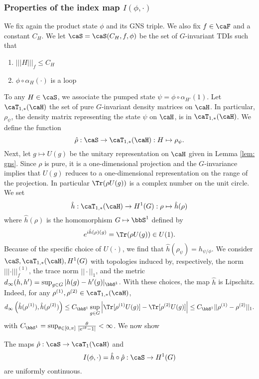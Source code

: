 \subsubsection{Properties of the index map $I(\phi,\cdot)$}

We fix again the product state $\phi$  and its GNS triple. We also fix $f\in\caF$ and a constant $C_H$.  
We let  $\caS=\caS(C_H,f,\phi)$ be the set of $G$-invariant TDIs such that
\begin{enumerate}
	\item $|||H|||_f \leq C_H$
	\item $\phi\circ\alpha_H(\cdot)$ is a loop
\end{enumerate}
To any $H \in \caS$, we associate the pumped state $\psi=\phi\circ\alpha_{H'}(1)$. 
Let  $\caT_{1,*}(\caH)$ the set of pure $G$-invariant density matrices on $\caH$. In particular,  $\rho_\psi$, the density matrix representing the state $\psi$ on $\caH$, is in $\caT_{1,*}(\caH)$.
We define the function
$$
\hat\rho: \caS\to \caT_{1,*}(\caH): H\mapsto \rho_\psi.
$$
Next, let $g\mapsto U(g)$ be the unitary representation on $\caH$ given in Lemma \ref{lem: gns}. Since $\rho$ is pure, it is a one-dimensional projection and the $G$-invariance implies that $U(g)$ reduces to a one-dimensional representation on the range of the projection. In particular $\Tr( \rho U(g))$ is a complex number on the unit circle. We set 
$$
\hat{h}:  \caT_{1,*}(\caH) \to H^1(G): \rho \mapsto \hat{h}(\rho)
$$
where $\hat{h}(\rho)$ is the homomorphism $G\mapsto \bbS^1$ defined by 
\begin{equation}\label{expression for charge}
e^{i \hat{h}(\rho)(g)}=\Tr( \rho U(g)) \in U(1).
\end{equation}
Because of the specific choice of $U(\cdot)$, we find that $\hat{h}(\rho_\psi)=h_{\psi/\phi}$. 
We consider $\caS,\caT_{1,*}(\caH), H^1(G)$ with  topologies induced by, respectively, the norm $|||\cdot|||^{(1)}_f$, the trace norm $||\cdot ||_1$, and the metric $d_\infty(h,h')=\sup_{g\in G}|h(g)-h'(g)|_{\bbS^1}$.  With these choices, the map $\hat{h}$ is Lipschitz. Indeed, for any $\rho^{(1)},\rho^{(2)} \in \caT_{1,*}(\caH) $,
$$
d_{\infty}\left(\hat{h}(\rho^{(1)}),\hat{h}(\rho^{(2)})\right)
\leq 
C_{\bbS^1} \sup_{g\in G} \left|\Tr [\rho^{(1)} U(g)] -\Tr [\rho^{(2)} U(g)] \right| \leq C_{\bbS^1} ||\rho^{(1)}-\rho^{(2)}||_1. 
$$
with $ C_{\bbS^1}=\sup_{\theta\in [0,\pi] } \frac{\theta}{ |e^{i\theta}-1|}  <\infty $. 
We now show 
\begin{lemma}\label{lem: uniform cont index}
	The maps
	$ \hat{\rho}: \caS \to \caT_1(\caH)$ and 
	$$
	I(\phi,\cdot)=\hat h\circ \hat\rho:   \caS \to H^1(G)  
	$$
	are uniformly continuous. 
\end{lemma}
